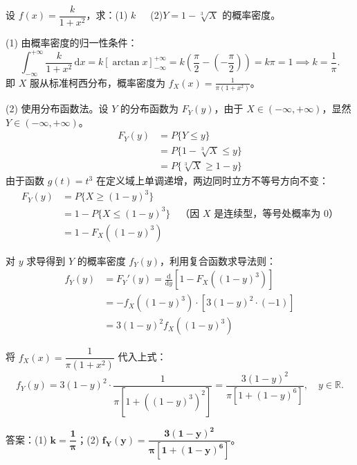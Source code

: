 ﻿\documentclass[lang=cn,11pt]{elegantbook}
\begin{document}
\begin{exercise}[柯西分布变换] \label{exer:2-49}
设 $f(x)=\dfrac{k}{1+x^2}$，求：(1) $k$~~~(2)$Y=1-\sqrt[3]{X}$ 的概率密度。
\end{exercise}
\begin{solution}
(1) 由概率密度的归一性条件：
\[
\int_{-\infty}^{+\infty} \frac{k}{1+x^2}\,\mathrm{d}x = k\left[\arctan x\right]_{-\infty}^{+\infty} = k\left(\frac{\pi}{2} - \left(-\frac{\pi}{2}\right)\right) = k\pi = 1 \implies k = \frac{1}{\pi}.
\]
即 $X$ 服从标准柯西分布，概率密度为 $f_X(x) = \frac{1}{\pi(1+x^2)}$。

(2) 使用分布函数法。设 $Y$ 的分布函数为 $F_Y(y)$，由于 $X \in (-\infty, +\infty)$，显然 $Y \in (-\infty, +\infty)$。
\begin{align*}
F_Y(y) &= P\{Y \le y\} \\
&= P\{1-\sqrt[3]{X} \le y\} \\
&= P\{\sqrt[3]{X} \ge 1-y\} 
\end{align*}
由于函数 $g(t) = t^3$ 在定义域上单调递增，两边同时立方不等号方向不变：
\begin{align*}
F_Y(y) &= P\{X \ge (1-y)^3\} \\
&= 1 - P\{X \le (1-y)^3\} \quad \text{（因 $X$ 是连续型，等号处概率为 $0$）} \\
&= 1 - F_X\left((1-y)^3\right)
\end{align*}

对 $y$ 求导得到 $Y$ 的概率密度 $f_Y(y)$，利用复合函数求导法则：
\begin{align*}
f_Y(y) &= F_Y'(y) = \frac{\mathrm{d}}{\mathrm{d}y} \left[ 1 - F_X\left((1-y)^3\right) \right] \\
&= -f_X\left((1-y)^3\right) \cdot \left[3(1-y)^2 \cdot (-1)\right] \\
&= 3(1-y)^2 f_X\left((1-y)^3\right)
\end{align*}

将 $f_X(x) = \dfrac{1}{\pi(1+x^2)}$ 代入上式：
\[
f_Y(y) = 3(1-y)^2 \cdot \frac{1}{\pi\left[1+\left((1-y)^3\right)^2\right]} = \frac{3(1-y)^2}{\pi\left[1+(1-y)^6\right]}, \quad y\in\mathbb{R}.
\]

答案：(1) $\boldsymbol{k=\dfrac{1}{\pi}}$；(2) $\boldsymbol{f_Y(y)=\dfrac{3(1-y)^2}{\pi[1+(1-y)^6]}}$。
\end{solution}
\end{document}
